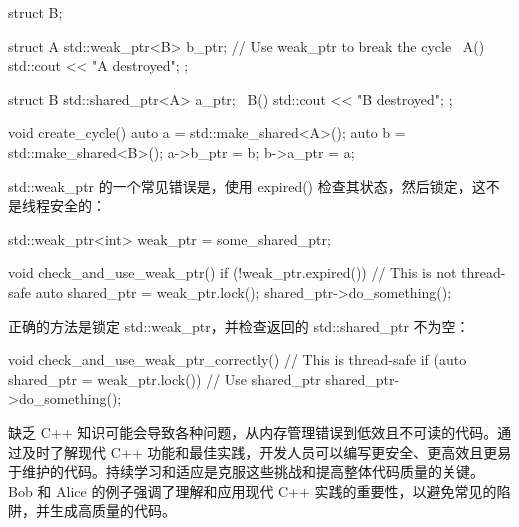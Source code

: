 \begin{cpp}
struct B;

struct A {
    std::weak_ptr<B> b_ptr; // Use weak_ptr to break the cycle
    ~A() { std::cout << "A destroyed\n"; }
};

struct B {
    std::shared_ptr<A> a_ptr;
    ~B() { std::cout << "B destroyed\n"; }
};

void create_cycle() {
    auto a = std::make_shared<A>();
    auto b = std::make_shared<B>();
    a->b_ptr = b;
    b->a_ptr = a;
}
\end{cpp}


std::weak\_ptr 的一个常见错误是，使用 expired() 检查其状态，然后锁定，这不是线程安全的：

\begin{cpp}
std::weak_ptr<int> weak_ptr = some_shared_ptr;

void check_and_use_weak_ptr() {
    if (!weak_ptr.expired()) {
        // This is not thread-safe
        auto shared_ptr = weak_ptr.lock();
        shared_ptr->do_something();
    }
}
\end{cpp}

正确的方法是锁定 std::weak\_ptr，并检查返回的 std::shared\_ptr 不为空：

\begin{cpp}
void check_and_use_weak_ptr_correctly() {
    // This is thread-safe
    if (auto shared_ptr = weak_ptr.lock()) {
        // Use shared_ptr
        shared_ptr->do_something();
    }
}
\end{cpp}

缺乏 C++ 知识可能会导致各种问题，从内存管理错误到低效且不可读的代码。通过及时了解现代 C++ 功能和最佳实践，开发人员可以编写更安全、更高效且更易于维护的代码。持续学习和适应是克服这些挑战和提高整体代码质量的关键。 Bob 和 Alice 的例子强调了理解和应用现代 C++ 实践的重要性，以避免常见的陷阱，并生成高质量的代码。




